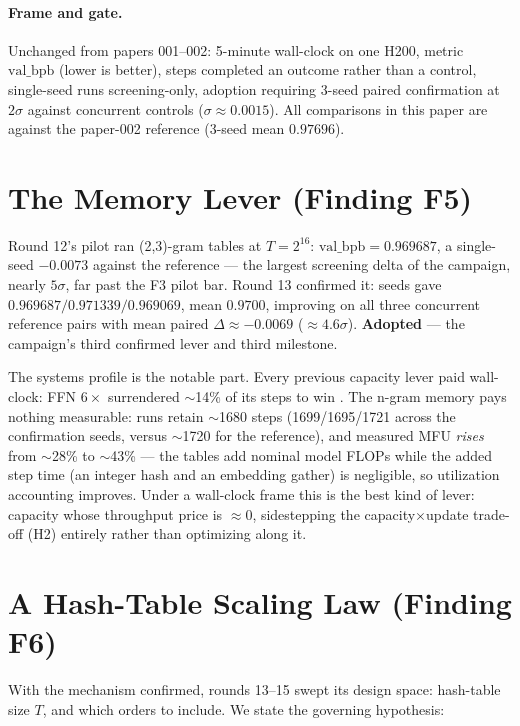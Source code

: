 \documentclass{article}
\newcommand{\valbpb}{\mathrm{val\_bpb}}
\begin{document}
\paragraph{Frame and gate.} Unchanged from papers 001--002: 5-minute wall-clock on one H200, metric $\valbpb$ (lower is better), steps completed an outcome rather than a control, single-seed runs screening-only, adoption requiring 3-seed paired confirmation at $2\sigma$ against concurrent controls ($\sigma \approx 0.0015$). All comparisons in this paper are against the paper-002 reference (3-seed mean $0.97696$).

\section{The Memory Lever (Finding F5)}
\label{sec:lever}

Round 12's pilot ran (2,3)-gram tables at $T = 2^{16}$: $\valbpb = 0.969687$, a single-seed $-0.0073$ against the reference --- the largest screening delta of the campaign, nearly $5\sigma$, far past the F3 pilot bar. Round 13 confirmed it: seeds gave $0.969687 / 0.971339 / 0.969069$, mean $\mathbf{0.9700}$, improving on all three concurrent reference pairs with mean paired $\Delta \approx -0.0069$ ($\approx 4.6\sigma$). \textbf{Adopted} --- the campaign's third confirmed lever and third milestone.

The systems profile is the notable part. Every previous capacity lever paid wall-clock: FFN $6\times$ surrendered $\sim$14\% of its steps to win \cite{ophis2026paper002}. The n-gram memory pays nothing measurable: runs retain $\sim$1680 steps (1699/1695/1721 across the confirmation seeds, versus $\sim$1720 for the reference), and measured MFU \emph{rises} from $\sim$28\% to $\sim$43\% --- the tables add nominal model FLOPs while the added step time (an integer hash and an embedding gather) is negligible, so utilization accounting improves. Under a wall-clock frame this is the best kind of lever: capacity whose throughput price is $\approx 0$, sidestepping the capacity$\times$update trade-off (H2) entirely rather than optimizing along it.

\section{A Hash-Table Scaling Law (Finding F6)}
\label{sec:scaling}

With the mechanism confirmed, rounds 13--15 swept its design space: hash-table size $T$, and which orders to include. We state the governing hypothesis:
\end{document}
